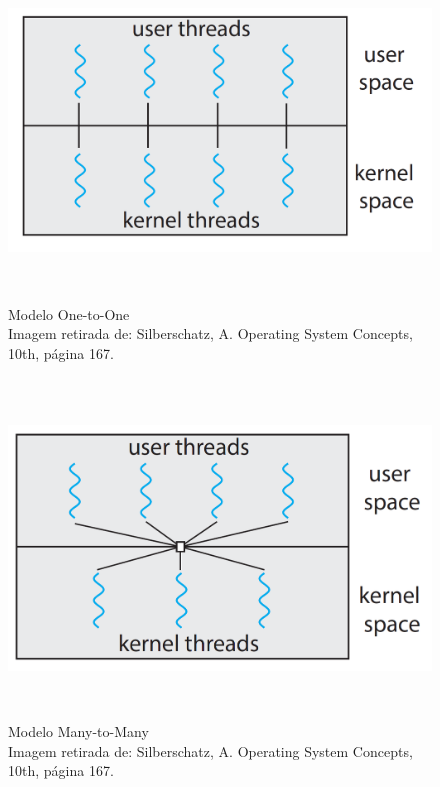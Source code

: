 \begin{figure}[h!]
\centering
\includegraphics[keepaspectratio, width=12cm, height=9cm]{imagens/06/06 - one-to-one.png}
\caption{Modelo One-to-One   \\
Imagem retirada de: Silberschatz, A. Operating System Concepts, 10th,
página 167. \\}
\label{fig:Modelo One-to-One}
\end{figure}

\begin{figure}[h!]
\centering
\includegraphics[keepaspectratio, width=12cm, height=9cm]{imagens/06/06 - many-to-many.png}
\caption{Modelo Many-to-Many  \\
Imagem retirada de: Silberschatz, A. Operating System Concepts, 10th,
página 167. \\}
\label{fig:Modelo Many-to-Many}
\end{figure}


